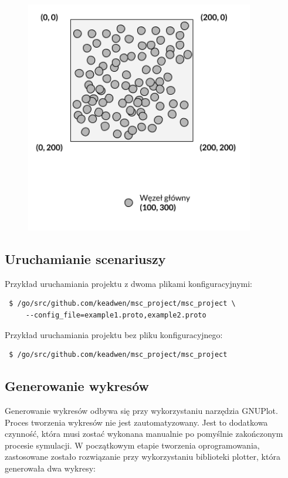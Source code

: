 \documentclass[a4paper,12pt,twoside,openany]{report}
\begin{document}
\begin{figure}[H]
 \centering
 \includegraphics[width=10cm]{images/przykladowa_sieci_wygenerowana.png} 
\end{figure}

\subsection{Uruchamianie scenariuszy}

Przykład uruchamiania projektu z dwoma plikami konfiguracyjnymi:
\begin{lstlisting}
 $ /go/src/github.com/keadwen/msc_project/msc_project \
     --config_file=example1.proto,example2.proto
\end{lstlisting}

Przykład uruchamiania projektu bez pliku konfiguracyjnego:
\begin{lstlisting}
 $ /go/src/github.com/keadwen/msc_project/msc_project
\end{lstlisting}

\subsection{Generowanie wykresów}

Generowanie wykresów odbywa się przy wykorzystaniu narzędzia GNUPlot. Proces tworzenia wykresów nie jest zautomatyzowany.
Jest to dodatkowa czynność, która musi zostać wykonana manualnie po pomyślnie zakończonym procesie symulacji.
W początkowym etapie tworzenia oprogramowania, zastosowane zostało rozwiązanie przy wykorzystaniu biblioteki plotter, która
generowała dwa wykresy:
\end{document}
